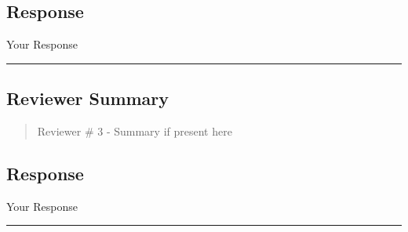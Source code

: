 \subsection{Response}  
Your Response \\
\noindent\rule{17cm}{2.0pt}


\subsection{Reviewer Summary}
\begin{mdframed}
\begin{quote}
	Reviewer \# 3 - Summary if present here
\end{quote}
\end{mdframed}

\subsection{Response} 
Your Response

\noindent\rule{17cm}{6.0pt}